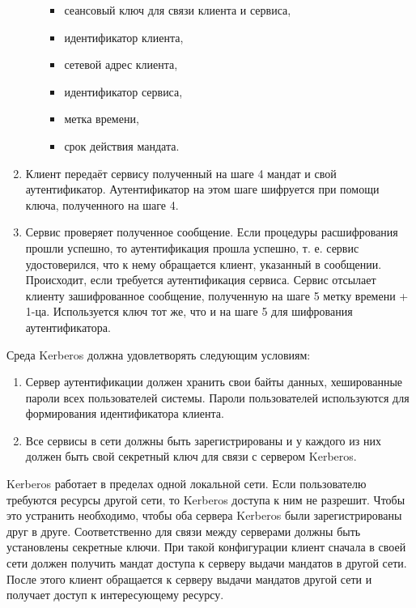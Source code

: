 \documentclass[12pt, russian, oneside, article]{ncc}
\begin{document}
\begin{enumerate}
\begin{itemize}
\begin{itemize}
\item сеансовый ключ для связи клиента и сервиса,
\item идентификатор клиента,
\item сетевой адрес клиента,
\item идентификатор сервиса,
\item метка времени,
\item срок действия мандата.
\end{itemize}

\end{itemize}

\item Клиент передаёт сервису полученный на шаге 4 мандат и свой аутентификатор. Аутентификатор на этом шаге шифруется при помощи ключа, полученного на шаге 4.
\item Сервис проверяет полученное сообщение. Если процедуры расшифрования прошли успешно, то аутентификация прошла успешно, т. е. сервис удостоверился, что к нему обращается клиент, указанный в сообщении. Происходит, если требуется аутентификация сервиса. Сервис отсылает клиенту зашифрованное сообщение, полученную на шаге 5 метку времени + 1-ца. Используется ключ тот же, что и на шаге 5 для шифрования аутентификатора.
\end{enumerate}

Среда Kerberos должна удовлетворять следующим условиям:
\begin{enumerate}
\item Сервер аутентификации должен хранить свои байты данных, хешированные пароли всех пользователей системы. Пароли пользователей используются для формирования идентификатора клиента.
\item Все сервисы в сети должны быть зарегистрированы и у каждого из них должен быть свой секретный ключ для связи с сервером Kerberos.
\end{enumerate}

Kerberos работает в пределах одной локальной сети. Если пользователю требуются ресурсы другой сети, то Kerberos доступа к ним не разрешит. Чтобы это устранить необходимо, чтобы оба сервера Kerberos были зарегистрированы друг в друге. Соответственно для связи между серверами должны быть установлены секретные ключи. При такой конфигурации клиент сначала в своей сети должен получить мандат доступа к серверу выдачи мандатов в другой сети. После этого клиент обращается к серверу выдачи мандатов другой сети и получает доступ к интересующему ресурсу.
\end{document}
